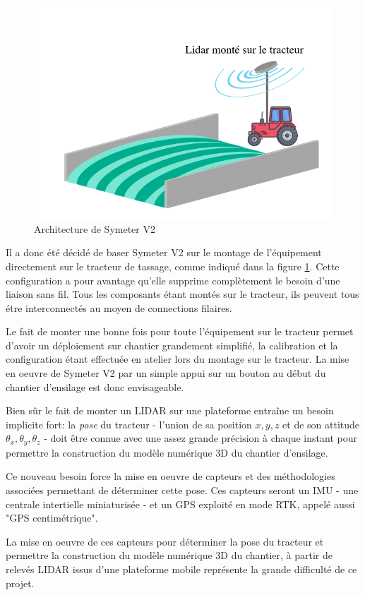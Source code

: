 \documentclass[12pt,a4paper]{report}
\begin{document}
		\begin{figure}[h!]
			\centering
			\includegraphics[width=0.6\linewidth]{img/LidarMobile}
			\caption[archiv2]{Architecture de Symeter V2}
			\label{fig:lidarmobile}
		\end{figure}
		
		\para Il a donc été décidé de baser Symeter V2 sur le montage de l'équipement directement sur le tracteur de tassage, comme indiqué dans la figure \ref{fig:lidarmobile}. Cette configuration a pour avantage qu'elle supprime complètement le besoin d'une liaison sans fil. Tous les composants étant montés sur le tracteur, ils peuvent tous étre interconnectés au moyen de connections filaires.
		
		\para Le fait de monter une bonne fois pour toute l'équipement sur le tracteur permet d'avoir un déploiement sur chantier grandement simplifié, la calibration et la configuration étant effectuée en atelier lors du montage sur le tracteur. La mise en oeuvre de Symeter V2 par un simple appui sur un bouton au début du chantier d'ensilage est donc envisageable.
		
		\para Bien sûr le fait de monter un LIDAR sur une plateforme entraîne un besoin implicite fort: la \textit{pose} du tracteur - l'union de sa position $x,y,z$ et de son attitude $\theta_x, \theta_y, \theta_z$ - doit être connue avec une assez grande précision à chaque instant pour permettre la construction du modèle numérique 3D du chantier d'ensilage.
		
		\para Ce nouveau besoin force la mise en oeuvre de capteurs et des méthodologies associées permettant de déterminer cette pose. Ces capteurs seront un IMU - une centrale intertielle miniaturisée - et un GPS exploité en mode RTK, appelé aussi "GPS centimétrique".
		
		\para La mise en oeuvre de ces capteurs pour déterminer la pose du tracteur et permettre la construction du modèle numérique 3D du chantier, à partir de relevés LIDAR issus d'une plateforme mobile représente la grande difficulté de ce projet.
		
\end{document}
